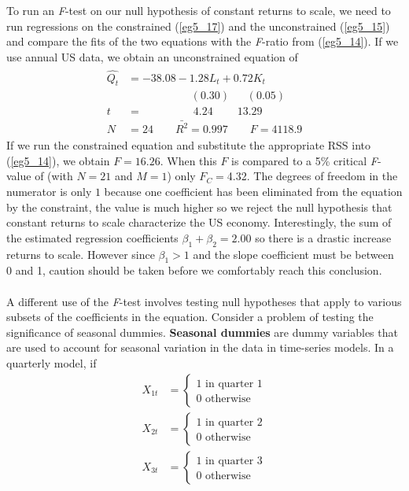 \documentclass[11pt]{article}
\begin{document}
To run an \textit{F}-test on our null hypothesis of constant returns to scale, we need to run regressions on the constrained (\ref{eg5_17}) and the unconstrained (\ref{eg5_15}) and compare the fits of the two equations with the \textit{F}-ratio from (\ref{eg5_14}). If we use annual US data, we obtain an unconstrained equation of
\begin{align}
\label{eg5_18}
\begin{split}
\hat{Q_t} &= -38.08 - {1.28L_t} + {0.72K_t}\\
&\>\>\>\>\>\>\>\>\>\>\>\>\>\>\>\>\>\>\>\>\>\>\>\>\>\> (0.30) 
\>\>\>\>\>\>\> (0.05)\\
t&=\>\>\>\>\>\>\>\>\>\>\>\>\>\>\>\>\>\>\>\>\> 4.24 
\>\>\>\>\>\>\>\>\>\> 13.29\\
N&=24\quad\quad\bar{R^2}=0.997 \quad\quad F=4118.9
\end{split}
\end{align}
If we run the constrained equation and substitute the appropriate RSS into (\ref{eg5_14}), we obtain $F=16.26$. When this $F$ is compared to a 5\% critical \textit{F}-value of (with $N=21$ and $M=1$) only $F_C=$4.32. The degrees of freedom in the numerator is only $1$ because one coefficient has been eliminated from the equation by the constraint, the value is much higher so we reject the null hypothesis that constant returns to scale characterize the US economy. Interestingly, the sum of the estimated regression coefficients $\beta_1+\beta_2=2.00$ so there is a drastic increase returns to scale. However since $\beta_1 > 1$ and the slope coefficient must be between 0 and 1, caution should be taken before we comfortably reach this conclusion.\\ \\
A different use of the \textit{F}-test involves testing null hypotheses that apply to various subsets of the coefficients in the equation. Consider a problem of testing the significance of seasonal dummies. \textbf{Seasonal dummies} are dummy variables that are used to account for seasonal variation in the data in time-series models. In a quarterly model, if
\begin{align*}
X_{1t} &= \begin{cases}
{1 \text{ in quarter 1}}\\{0 \text{ otherwise}}
\end{cases}\\
X_{2t} &= \begin{cases}
{1 \text{ in quarter 2}}\\{0 \text{ otherwise}}
\end{cases}\\
X_{3t} &= \begin{cases}
{1 \text{ in quarter 3}}\\{0 \text{ otherwise}}
\end{cases}\\
\end{align*}
\end{document}
